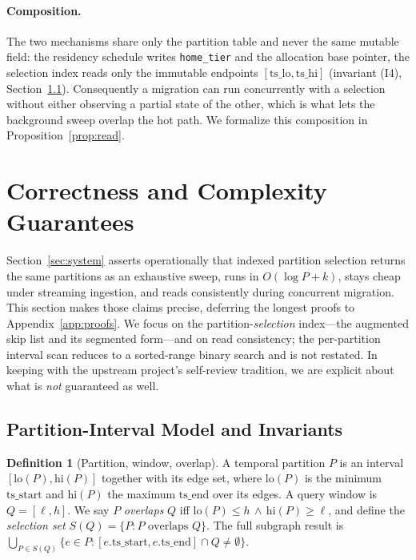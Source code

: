\documentclass[10pt]{article}
\theoremstyle{definition}
\newtheorem{definition}{Definition}
\begin{document}
\paragraph{Composition.}
The two mechanisms share only the partition table and never the same mutable
field: the residency schedule writes \texttt{home\_tier} and the allocation base
pointer, the selection index reads only the immutable endpoints
$[\mathrm{ts\_lo},\mathrm{ts\_hi}]$ (invariant (I4), Section~\ref{sec:model}).
Consequently a migration can run concurrently with a selection without either
observing a partial state of the other, which is what lets the background sweep
overlap the hot path. We formalize this composition in
Proposition~\ref{prop:read}.
\section{Correctness and Complexity Guarantees}
\label{sec:guarantees}

Section~\ref{sec:system} asserts operationally that indexed partition selection
returns the same partitions as an exhaustive sweep, runs in $O(\log P + k)$, stays
cheap under streaming ingestion, and reads consistently during concurrent
migration. This section makes those claims precise, deferring the longest proofs to
Appendix~\ref{app:proofs}. We focus on the partition-\emph{selection} index---the
augmented skip list and its segmented form---and on read consistency; the
per-partition interval scan reduces to a sorted-range binary search and is not
restated. In keeping with the upstream project's self-review tradition, we are
explicit about what is \emph{not} guaranteed as well.

\subsection{Partition-Interval Model and Invariants}
\label{sec:model}

\begin{definition}[Partition, window, overlap]
\label{def:model}
A temporal partition $P$ is an interval $[\mathrm{lo}(P),\mathrm{hi}(P)]$ together
with its edge set, where $\mathrm{lo}(P)$ is the minimum $\mathrm{ts\_start}$ and
$\mathrm{hi}(P)$ the maximum $\mathrm{ts\_end}$ over its edges. A query window is
$Q=[\ell,h]$. We say $P$ \emph{overlaps} $Q$ iff
$\mathrm{lo}(P)\le h \,\wedge\, \mathrm{hi}(P)\ge \ell$, and define the
\emph{selection set} $S(Q)=\{P: P \text{ overlaps } Q\}$. The full subgraph result
is $\bigcup_{P\in S(Q)}\{e\in P : [e.\mathrm{ts\_start}, e.\mathrm{ts\_end}]\cap Q \neq \emptyset\}$.
\end{definition}
\end{document}
